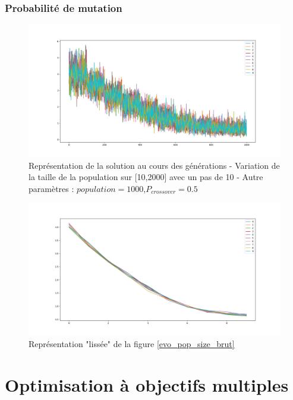 \documentclass[12pt]{report}
\begin{document}
      \subsection{Probabilité de mutation}

      \begin{figure}[h]
        \centering
        \includegraphics[width=15cm]{img/evo_mutation_brut.png}
        \caption{Représentation de la solution au cours des générations - Variation de la taille de la population sur [10,2000] avec un pas de 10 - Autre paramètres : $population = 1000$,$P_{crossover} = 0.5$}
        \label{evo_mutation_brut}
      \end{figure}

      \begin{figure}[!]
        \centering
        \includegraphics[width=15cm]{img/evo_mutation_moy.png}
        \caption{Représentation "lissée" de la figure \ref{evo_pop_size_brut}}
        \label{evo_mutation_moy}
      \end{figure}






  \chapter{Optimisation à objectifs multiples}
\end{document}
